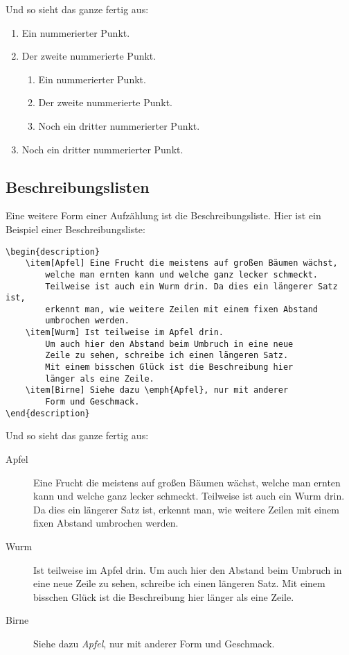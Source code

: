 Und so sieht das ganze fertig aus:

\begin{enumerate}
	\item Ein nummerierter Punkt.
	\item Der zweite nummerierte Punkt.
	\begin{enumerate}
		\item Ein nummerierter Punkt.
		\item Der zweite nummerierte Punkt.
		\item Noch ein dritter nummerierter Punkt.
	\end{enumerate}
	\item Noch ein dritter nummerierter Punkt.
\end{enumerate}


\subsection{Beschreibungslisten}

Eine weitere Form einer Aufzählung ist die Beschreibungsliste. Hier ist ein Beispiel einer Beschreibungsliste:
\begin{lstlisting}
\begin{description}
	\item[Apfel] Eine Frucht die meistens auf großen Bäumen wächst,
		welche man ernten kann und welche ganz lecker schmeckt.
		Teilweise ist auch ein Wurm drin. Da dies ein längerer Satz ist,
		erkennt man, wie weitere Zeilen mit einem fixen Abstand 
		umbrochen werden.
	\item[Wurm] Ist teilweise im Apfel drin.
		Um auch hier den Abstand beim Umbruch in eine neue 
		Zeile zu sehen, schreibe ich einen längeren Satz.
		Mit einem bisschen Glück ist die Beschreibung hier
		länger als eine Zeile.
	\item[Birne] Siehe dazu \emph{Apfel}, nur mit anderer
		Form und Geschmack.
\end{description}
\end{lstlisting}

Und so sieht das ganze fertig aus:

\begin{description}
	\item[Apfel] Eine Frucht die meistens auf großen Bäumen wächst,
		welche man ernten kann und welche ganz lecker schmeckt.
		Teilweise ist auch ein Wurm drin. Da dies ein längerer Satz ist,
		erkennt man, wie weitere Zeilen mit einem fixen Abstand 
		umbrochen werden.
	\item[Wurm] Ist teilweise im Apfel drin.
		Um auch hier den Abstand beim Umbruch in eine neue Zeile zu sehen,
		schreibe ich einen längeren Satz. Mit einem bisschen Glück ist die
		Beschreibung hier länger als eine Zeile.
	\item[Birne] Siehe dazu \emph{Apfel}, nur mit anderer Form und Geschmack.
\end{description}

